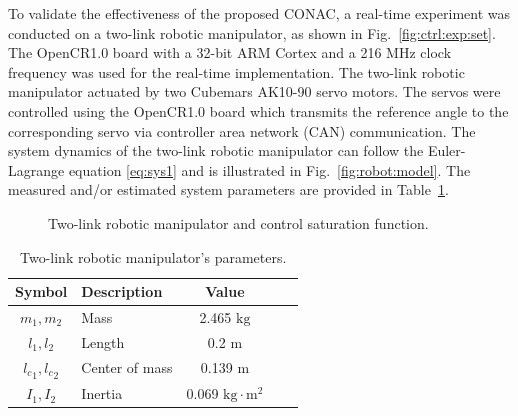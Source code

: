 \documentclass[journal]{IEEEtran}
\begin{document}
To validate the effectiveness of the proposed CONAC, a real-time experiment was conducted on a two-link robotic manipulator, as shown in Fig.~\ref{fig:ctrl:exp:set}. 
The OpenCR1.0 board \cite{opencr} with a 32-bit ARM Cortex and a 216 MHz clock frequency was used for the real-time implementation.
The two-link robotic manipulator actuated by two Cubemars AK10-90 servo motors. 
The servos were controlled using the OpenCR1.0 board which transmits the reference angle to the corresponding servo via controller area network (CAN) communication.
The system dynamics of the two-link robotic manipulator can follow the Euler-Lagrange equation \eqref{eq:sys1} and is illustrated in Fig.~\ref{fig:robot:model}. 
The measured and/or estimated system parameters are provided in Table~\ref{table:system:params}. 

\begin{figure}[t]
    \centering
    \hfill
    \caption{Two-link robotic manipulator and control saturation function.}
    \label{fig:robot}
\end{figure}

\begin{table}[t]
    \renewcommand{\arraystretch}{1.3}
    \caption{Two-link robotic manipulator's parameters.}
    \centering
    \begin{tabular}{c m{9.5em} c c c }
    \hline
    \textbf{Symbol} & \textbf{Description} & \textbf{Value} \\
    \hline
    \hline 
    $m_1,m_2$ & Mass & 2.465 $\mathrm{kg}$ \\
    \hline
    $l_1,l_2$  & Length & 0.2 $\mathrm{m}$ \\  
    \hline
    ${l_c}_1,{l_c}_2$ & Center of mass & 0.139 $\mathrm{m}$ \\
    \hline
    $I_1,I_2$  & Inertia & 0.069 $\mathrm{kg\cdot m^{2}}$ \\
    \hline
    \end{tabular}
    \label{table:system:params}
\end{table}
\end{document}
